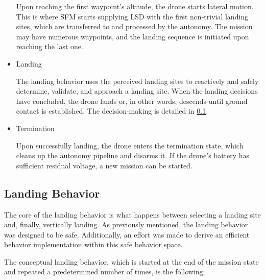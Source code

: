 \begin{itemize}
    Upon reaching the first waypoint's altitude, the drone starts lateral motion. This is where SFM starts supplying LSD with the first non-trivial landing sites, which are transferred to and processed by the autonomy. The mission may have numerous waypoints, and the landing sequence is initiated upon reaching the last one.

    \item Landing
    
    The landing behavior uses the perceived landing sites to reactively and safely determine, validate, and approach a landing site. When the landing decisions have concluded, the drone lands or, in other words, descends until ground contact is established. The decision-making is detailed in \cref{subsec:landing_behavior}. 

    \item Termination

    Upon successfully landing, the drone enters the termination state, which cleans up the autonomy pipeline and disarms it. If the drone's battery has sufficient residual voltage, a new mission can be started.
\end{itemize}

\subsection{Landing Behavior}\label{subsec:landing_behavior}

The core of the landing behavior is what happens between selecting a landing site and, finally, vertically landing. As previously mentioned, the landing behavior was designed to be safe. Additionally, an effort was made to derive an efficient behavior implementation within this safe behavior space.

The conceptual landing behavior, which is started at the end of the mission state and repeated a predetermined number of times, is the following:

